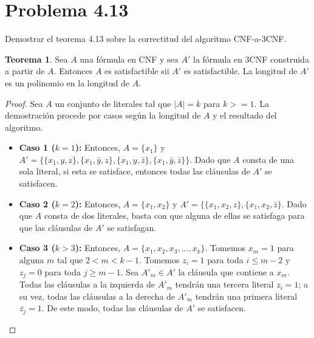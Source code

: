 \documentclass[letterpaper,12pt]{article}
\theoremstyle{definition}
\newtheorem*{thm}{Teorema}
\begin{document}


\section*{Problema 4.13}

Demostrar el teorema 4.13 sobre la correctitud del algoritmo CNF-a-3CNF.

\begin{thm}
  Sea \(A\) una fórmula en CNF y sea \(A'\) la fórmula en 3CNF construida a partir de \(A\). Entonces \(A\) es satisfactible sii \(A'\) es satisfactible. La longitud de \(A'\) es un polinomio en la longitud de \(A\).
\end{thm}


\begin{proof}
  Sea \(A\) un conjunto de literales tal que \(|A| = k\) para \(k >= 1\). La demostración procede por casos según la longitud de \(A\) y el resultado del algoritmo.

  \begin{itemize}
    \item \textbf{Caso 1 (\(k = 1\)): } Entonces, \(A = \{x_1\}\) y \(A' = \{ \{x_1, y, z\}, \{x_1, \bar{y}, z\}, \{x_1, y, \bar{z}\}, \{x_1, \bar{y}, \bar{z} \} \}\). Dado que \(A\) consta de una sola literal, si esta se satisface, entonces todas las cláusulas de \(A'\) se satisfacen.
    \item \textbf{Caso 2 (\(k = 2\)): } Entonces, \(A = \{x_1, x_2\}\) y \(A' = \{ \{x_1, x_2, z\}, \{x_1, x_2, \bar{z} \}\). Dado que \(A\) consta de dos literales, basta con que alguna de ellas se satisfaga para que las cláusulas de \(A'\) se satisfagan.
    \item \textbf{Caso 3 (\(k > 3\)): } Entonces, \(A = \{x_1, x_2, x_3, ..., x_k\}\). Tomemos \(x_m = 1\) para alguna \(m\) tal que \(2 < m < k - 1\). Tomemos \(z_i = 1\) para toda \(i \leq m - 2\) y \(z_j = 0\) para toda \(j \geq m - 1\). Sea \( A'_m \in A' \) la cláusula que contiene a \(x_m\). Todas las cláusulas a la izquierda de \( A'_m\) tendrán una tercera literal \(z_i = 1\); a su vez, todas las cláusulas a la derecha de \( A'_m\) tendrán una primera literal \(\bar{z_j} = 1\). De este modo, todas las cláusulas de \(A'\) se satisfacen.
  \end{itemize} 
\end{proof}
\end{document}
